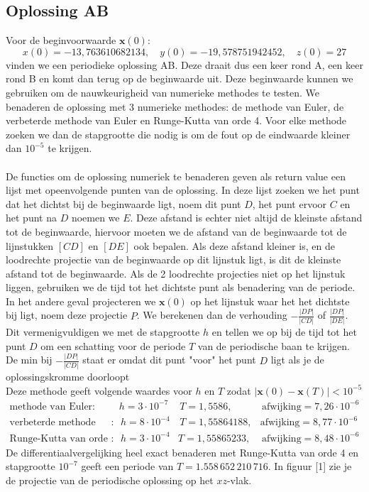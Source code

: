 \documentclass[12pt, a4paper]{article}
\theoremstyle{definition}
\begin{document}
\subsection{Oplossing AB}
Voor de beginvoorwaarde $\textbf{x}(0)$:
$$x(0) =−13,763 610 682 134, \quad y(0) =−19,578 751 942 452, \quad   z(0) = 27$$
vinden we een periodieke oplossing AB. Deze draait dus een keer rond A, een keer rond B en komt dan terug op de beginwaarde uit. Deze beginwaarde kunnen we gebruiken om de nauwkeurigheid van numerieke methodes te testen. We benaderen de oplossing met 3 numerieke methodes: de methode van Euler, de verbeterde methode van Euler en Runge-Kutta van orde 4. Voor elke methode zoeken we dan de stapgrootte die nodig is om de fout op de eindwaarde kleiner dan $10^{-5}$ te krijgen.\\
\\
De functies om de oplossing numeriek te benaderen geven als return value een lijst met opeenvolgende punten van de oplossing. In deze lijst zoeken we het punt dat het dichtst bij de beginwaarde ligt, noem dit punt $D$, het punt ervoor $C$ en het punt na $D$ noemen we $E$. Deze afstand is echter niet altijd de kleinste afstand tot de beginwaarde, hiervoor moeten we de afstand van de beginwaarde tot de lijnstukken $[CD]$ en $[DE]$ ook bepalen. Als deze afstand kleiner is, en de loodrechte projectie van de beginwaarde op dit lijnstuk ligt, is dit de kleinste afstand tot de beginwaarde. Als de 2 loodrechte projecties niet op het lijnstuk liggen, gebruiken we de tijd tot het dichtste punt als benadering van de periode. In het andere geval projecteren we $\textbf{x}(0)$ op het lijnstuk waar het het dichtste bij ligt, noem deze projectie $P$. We berekenen dan de verhouding $-\frac{|DP|}{|CD|}$ of $\frac{|DP|}{|DE|}$. Dit vermenigvuldigen we met de stapgrootte $h$ en tellen we op bij de tijd tot het punt $D$ om een schatting voor de periode $T$ van de periodische baan te krijgen. De min bij $-\frac{|DP|}{|CD|}$ staat er omdat dit punt "voor" het punt $D$ ligt als je de oplossingskromme doorloopt\\
Deze methode geeft volgende waardes voor $h$ en $T$ zodat $|\textbf{x}(0) - \textbf{x}(T)| < 10^{-5}$
\begin{align*}
\text{methode van Euler}: & h = 3 \cdot 10^{-7} & \, T = 1,5586, &\, \text{afwijking} = 7,26 \cdot 10^{-6}\\
\text{verbeterde methode van Euler}: & \, h = 8 \cdot 10^{-4} &\, T = 1,55864188, & \text{afwijking} = 8,77 \cdot 10^{-6}\\
\text{Runge-Kutta van orde 4}: &\, h = 3 \cdot 10^{-4} & T = 1,55865233, &\, \text{afwijking} = 8,48 \cdot 10^{-6}
\end{align*}
De differentiaalvergelijking heel exact benaderen met Runge-Kutta van orde 4 en stapgrootte $10^{-7}$ geeft een periode van $T=1.558 \, 652 \, 210 \, 716$. In figuur [1] zie je de projectie van de periodische oplossing op het $xz$-vlak.
\end{document}
